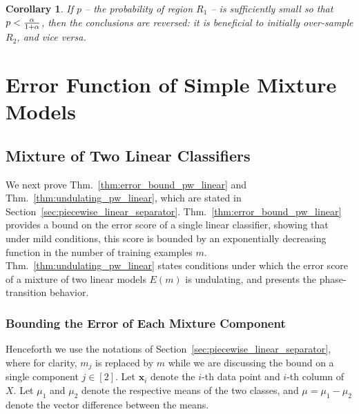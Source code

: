 \documentclass{article}
\newcommand{\bx}{\bm{x}}
\newcommand{\pR}{1}\newcommand{\rR}{2}\newcommand{\prR}{i}
\newtheorem{corollary}{Corollary}
\begin{document}
\begin{corollary}
If $p$ -- the probability of region $R_\pR$ -- is sufficiently small so that $p<\frac{\alpha}{1+\alpha}$, then the conclusions are reversed: it is beneficial to initially over-sample $R_\rR$, and vice versa. 
\end{corollary}



\section{Error Function of Simple Mixture Models}
\label{app:simple_mixture_models_error_func}

\subsection{Mixture of Two Linear Classifiers}
\label{app:linear-model}

We next prove Thm.~\ref{thm:error_bound_pw_linear} and Thm.~\ref{thm:undulating_pw_linear}, which are stated in Section~\ref{sec:piecewise_linear_separator}. Thm.~\ref{thm:error_bound_pw_linear} provides a bound on the error score of a single linear classifier, showing that under mild conditions, this score is bounded by an exponentially decreasing function in the number of training examples $m$. Thm.~\ref{thm:undulating_pw_linear} states  conditions under which the error score of a mixture of two linear models $E(m)$ is undulating, and presents the phase-transition behavior. 






\subsubsection{Bounding the Error of Each Mixture Component}
Henceforth we use the notations of Section~\ref{sec:piecewise_linear_separator}, where for clarity, $m_j$ is replaced by $m$ while we are discussing the bound on a single component $j\in[2]$. Let $\bx_i$ denote the $i$-th data point and $i$-th column of $X$. Let $\mu_1$ and $\mu_2$ denote the respective means of the two classes, and $\mu=\mu_1-\mu_2$ denote the vector difference between the means. 
\end{document}
